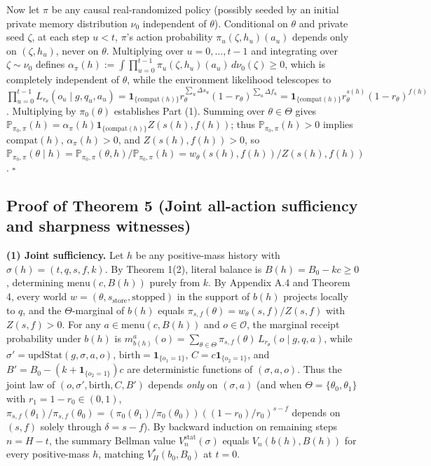 \documentclass[11pt,a4paper]{article}
\begin{document}
Now let \(\pi\) be any causal real-randomized policy (possibly seeded by
an initial private memory distribution \(\nu_0\) independent of
\(\theta\)). Conditional on \(\theta\) and private seed \(\zeta\), at
each step \(u < t\), \(\pi\)'s action probability
\(\pi_u(\zeta, h_u)(a_u)\) depends only on \((\zeta, h_u)\), never on
\(\theta\). Multiplying over \(u = 0, \dots, t-1\) and integrating over
\(\zeta \sim \nu_0\) defines
\(\alpha_\pi(h) := \int \prod_{u=0}^{t-1} \pi_u(\zeta, h_u)(a_u)\, d\nu_0(\zeta) \ge 0\),
which is completely independent of \(\theta\), while the environment
likelihood telescopes to
\(\prod_{u=0}^{t-1} L_{r_\theta}(o_u \mid g, q_u, a_u) = \mathbf{1}_{\{\mathrm{compat}(h)\}} r_\theta^{\sum_u \Delta s_u} (1 - r_\theta)^{\sum_u \Delta f_u} = \mathbf{1}_{\{\mathrm{compat}(h)\}} r_\theta^{s(h)} (1 - r_\theta)^{f(h)}\).
Multiplying by \(\pi_0(\theta)\) establishes Part (1). Summing over
\(\theta \in \Theta\) gives
\(\mathbb{P}_{\pi_0, \pi}(h) = \alpha_\pi(h) \mathbf{1}_{\{\mathrm{compat}(h)\}} Z(s(h), f(h))\);
thus \(\mathbb{P}_{\pi_0, \pi}(h) > 0\) implies \(\mathrm{compat}(h)\),
\(\alpha_\pi(h) > 0\), and \(Z(s(h), f(h)) > 0\), so
\(\mathbb{P}_{\pi_0, \pi}(\theta \mid h) = \mathbb{P}_{\pi_0, \pi}(\theta, h) / \mathbb{P}_{\pi_0, \pi}(h) = w_\theta(s(h), f(h)) / Z(s(h), f(h))\).
\(\square\)

\subsection{Proof of Theorem 5 (Joint all-action sufficiency and
sharpness
witnesses)}\label{proof-of-theorem-5-joint-all-action-sufficiency-and-sharpness-witnesses}

\textbf{(1) Joint sufficiency.} Let \(h\) be any positive-mass history
with \(\sigma(h) = (t, q, s, f, k)\). By Theorem 1(2), literal balance
is \(B(h) = B_0 - kc \ge 0\), determining \(\mathrm{menu}(c, B(h))\)
purely from \(k\). By Appendix A.4 and Theorem 4, every world
\(w = (\theta, s_{\mathrm{store}}, \mathrm{stopped})\) in the support of
\(b(h)\) projects locally to \(q\), and the \(\Theta\)-marginal of
\(b(h)\) equals \(\pi_{s,f}(\theta) = w_\theta(s,f)/Z(s,f)\) with
\(Z(s,f) > 0\). For any \(a \in \mathrm{menu}(c, B(h))\) and
\(o \in \mathcal{O}\), the marginal receipt probability under \(b(h)\)
is
\(m_{b(h)}^a(o) = \sum_{\theta \in \Theta} \pi_{s,f}(\theta)\, L_{r_\theta}(o \mid g, q, a)\),
while \(\sigma' = \mathrm{updStat}(g, \sigma, a, o)\),
\(\mathrm{birth} = \mathbf{1}_{\{o_1=1\}}\),
\(C = c\mathbf{1}_{\{o_2=1\}}\), and
\(B' = B_0 - (k + \mathbf{1}_{\{o_2=1\}})c\) are deterministic functions
of \((\sigma, a, o)\). Thus the joint law of
\((o, \sigma', \mathrm{birth}, C, B')\) depends \emph{only} on
\((\sigma, a)\) (and when \(\Theta = \{\theta_0, \theta_1\}\) with
\(r_1 = 1 - r_0 \in (0,1)\),
\(\pi_{s,f}(\theta_1)/\pi_{s,f}(\theta_0) = (\pi_0(\theta_1)/\pi_0(\theta_0))((1-r_0)/r_0)^{s-f}\)
depends on \((s,f)\) solely through \(\delta = s - f\)). By backward
induction on remaining steps \(n = H - t\), the summary Bellman value
\(V_n^{\mathrm{stat}}(\sigma)\) equals \(V_n(b(h), B(h))\) for every
positive-mass \(h\), matching \(V_H^*(b_0, B_0)\) at \(t = 0\).
\end{document}
